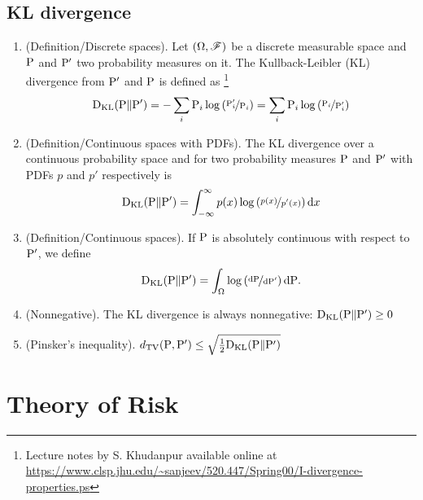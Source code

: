 \documentclass[a4paper,10pt]{article}
\begin{document}
\subsection{KL divergence}
\begin{enumerate}
 \item (Definition/Discrete spaces). Let $(\Omega, \mathscr{F})$ be a discrete measurable space and $\mathrm{P}$ and $\mathrm{P}'$ two probability measures
       on it. The Kullback-Leibler (KL) divergence from $\mathrm{P}'$ and $\mathrm{P}$ is defined as%
	  \footnote{Lecture notes by S. Khudanpur available online at \url{https://www.clsp.jhu.edu/~sanjeev/520.447/Spring00/I-divergence-properties.ps}}
       \[
        \mathrm{D}_{\mathrm{KL}}(\mathrm{P} \| \mathrm{P}') = -\sum_i \mathrm{P}_i \log \left(\nicefrac{\mathrm{P}'_i}{\mathrm{P}_i}\right) = \sum_i \mathrm{P}_i \log \left(\nicefrac{\mathrm{P}_i}{\mathrm{P}'_i}\right)
       \]
 \item (Definition/Continuous spaces with PDFs). The KL divergence over a continuous probability space and for two 
       probability measures $\mathrm{P}$ and $\mathrm{P}'$  with PDFs $p$ and $p'$ respectively is
       \[
        \mathrm{D}_{\mathrm{KL}}(\mathrm{P} \| \mathrm{P}') = \int_{-\infty}^{\infty}p(x)\log\left(\nicefrac{p(x)}{p'(x)}\right)\mathrm{d} x
       \]       
 \item (Definition/Continuous spaces). If $\mathrm{P}$ is absolutely continuous with respect to $\mathrm{P}'$, we define
       \[
        \mathrm{D}_{\mathrm{KL}}(\mathrm{P} \| \mathrm{P}') = \int_{\Omega}\log \left( \nicefrac{\mathrm{d}\mathrm{P}}{\mathrm{d}\mathrm{P}'}\right) \mathrm{d}\mathrm{P}.
       \]

 \item (Nonnegative). The KL divergence is always nonnegative: $\mathrm{D}_{\mathrm{KL}}(\mathrm{P} \| \mathrm{P}')\geq 0$
 \item (Pinsker's inequality). $d_{\mathrm{TV}}(\mathrm{P},\mathrm{P}')\leq \sqrt{\tfrac{1}{2}\mathrm{D}_{\mathrm{KL}}(\mathrm{P}\| \mathrm{P}')}$
\end{enumerate}


\section{Theory of Risk}
\end{document}
